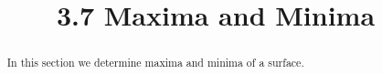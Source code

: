 \documentclass[handout]{ximera}
\title{3.7 Maxima and Minima}
\begin{document}
\begin{abstract}
In this section we determine maxima and minima of a surface.
\end{abstract}

\maketitle
\end{document}
